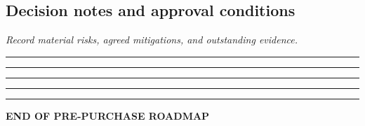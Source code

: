 \documentclass[10pt,letterpaper]{article}
\begin{document}
\subsection*{Decision notes and approval conditions}
\textit{Record material risks, agreed mitigations, and outstanding evidence.}

\vspace{13pt}\noindent\rule{\linewidth}{.3pt}

\vspace{13pt}\noindent\rule{\linewidth}{.3pt}

\vspace{13pt}\noindent\rule{\linewidth}{.3pt}

\vspace{13pt}\noindent\rule{\linewidth}{.3pt}

\vspace{13pt}\noindent\rule{\linewidth}{.3pt}
\vfill
{\centering\sffamily\bfseries\color{Navy} END OF PRE-PURCHASE ROADMAP\par}
\end{document}
